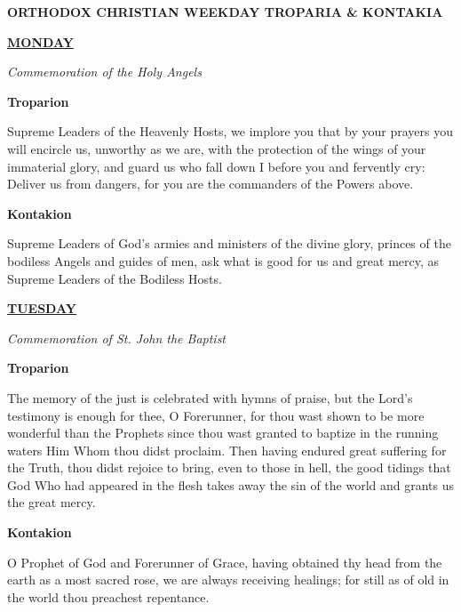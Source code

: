 \documentclass{article}
\begin{document}
\noindent
\centering
{
\color{red}
\tiny
\textbf{ORTHODOX CHRISTIAN WEEKDAY TROPARIA \& KONTAKIA}
}
\smallskip

\noindent
\centering
{
\footnotesize
\underline{\textbf{MONDAY}}
}
\smallskip

\noindent
\centering
{
\color{red}
\footnotesize
\textit{Commemoration of the Holy Angels}
}
\smallskip

\noindent
\centering
{
\footnotesize
\textbf{Troparion}
}

\noindent
\justifying
{
\scriptsize
Supreme Leaders of the Heavenly Hosts, we implore you that by your prayers you will encircle us, unworthy as we are, with the protection of the wings of your immaterial glory, and guard us who fall down I before you and fervently cry: Deliver us from dangers, for you are the commanders of the Powers above.
}
\smallskip

\noindent
\centering
{
\footnotesize
\textbf{Kontakion}
}

\noindent
\justifying
{
\scriptsize
Supreme Leaders of God's armies and ministers of the divine glory, princes of the bodiless Angels and guides of men, ask what is good for us and great mercy, as Supreme Leaders of the Bodiless Hosts.
}
\medskip

\noindent
\centering
{
\footnotesize
\underline{\textbf{TUESDAY}}
}
\smallskip

\noindent
\centering
{
\color{red}
\footnotesize
\textit{Commemoration of St. John the Baptist}
}
\smallskip

\noindent
\centering
{
\footnotesize
\textbf{Troparion}
}

\noindent
\justifying
{
\scriptsize
The memory of the just is celebrated with hymns of praise, but the Lord's testimony is enough for thee, O Forerunner, for thou wast shown to be more wonderful than the Prophets since thou wast granted to baptize in the running waters Him Whom thou didst proclaim. Then having endured great suffering for the Truth, thou didst rejoice to bring, even to those in hell, the good tidings that God Who had appeared in the flesh takes away the sin of the world and grants us the great mercy.
}
\smallskip

\noindent
\centering
{
\footnotesize
\textbf{Kontakion}
}

\noindent
\justifying
{
\scriptsize
O Prophet of God and Forerunner of Grace, having obtained thy head from the earth as a most sacred rose, we are always receiving healings; for still as of old in the world thou preachest repentance.
}
\medskip
\end{document}
